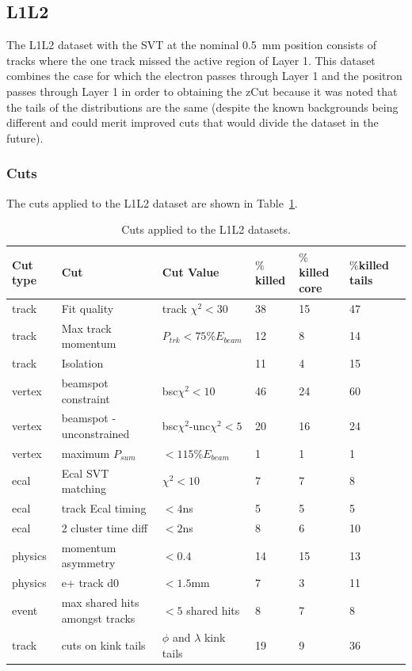 \documentclass[twoside]{article}
\begin{document}
\subsection{L1L2}

The L1L2 dataset with the SVT at the nominal 0.5~mm position consists of tracks where the one track missed the active region of Layer 1. This dataset combines the case for which the electron passes through Layer 1 and the positron passes through Layer 1 in order to obtaining the zCut because it was noted that the tails of the distributions are the same (despite the known backgrounds being different and could merit improved cuts that would divide the dataset in the future). 

\subsubsection{Cuts}

The cuts applied to the L1L2 dataset are shown in Table~\ref{l1l2_cuts}. 

\begin{table}[H]
\caption{Cuts applied to the L1L2 datasets.}
\label{l1l2_cuts}
\centering
\begin{tabular}{lllllll}
\toprule
Cut type & Cut & Cut Value &  $\%$killed &  $\%$killed core & $\%$killed tails\\
\midrule
track & Fit quality & track $\chi^{2}<30$ & 38 & 15 & 47 \\
track & Max track momentum &  $P_{trk}<75\%E_{beam}$ & 12 & 8 & 14 \\
track & Isolation &   & 11 & 4 & 15 \\
vertex & beamspot constraint & bsc$\chi^{2}<10$  & 46 & 24 & 60 \\
vertex & beamspot - unconstrained & bsc$\chi^{2}$-unc$\chi^2<5$  & 20 & 16 & 24 \\
vertex & maximum $P_{sum}$ &  $<115\%E_{beam}$ & 1 & 1 & 1 \\
ecal & Ecal SVT matching & $\chi^2<10$  & 7 & 7 & 8 \\
ecal & track Ecal timing & $<4$ns  & 5 & 5 & 5 \\
ecal & 2 cluster time diff & $<2$ns  & 8 & 6 & 10 \\
physics & momentum asymmetry & $<0.4$  & 14 & 15 & 13 \\
physics & e+ track d0 & $<1.5$mm  & 7 & 3 & 11 \\
event & max shared hits amongst tracks & $<5$ shared hits  & 8 & 7 & 8 \\
track & cuts on kink tails & $\phi$ and $\lambda$ kink tails & 19 & 9 & 36 \\
\bottomrule
\end{tabular}
\end{table}
\end{document}
